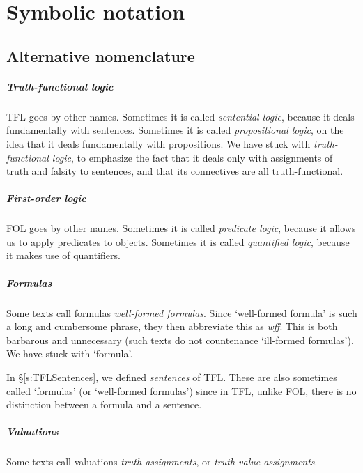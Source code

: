
\chapter{Symbolic notation}
\label{app.notation}

\section{Alternative nomenclature}

\paragraph{Truth-functional logic} TFL goes by other names. Sometimes it is called \emph{sentential logic}, because it deals fundamentally with sentences. Sometimes it is called \emph{propositional logic}, on the idea that it deals fundamentally with propositions. We have stuck with \emph{truth-functional logic}, to emphasize the fact that it deals only with assignments of truth and falsity to sentences, and that its connectives are all truth-functional.

\paragraph{First-order logic} FOL goes by other names. Sometimes it is called \emph{predicate logic}, because it allows us to apply  predicates to objects. Sometimes it is called \emph{quantified logic}, because it makes use of quantifiers.

\paragraph{Formulas} Some texts call formulas \emph{well-formed formulas}. Since `well-formed formula' is such a long and cumbersome phrase, they then abbreviate this as \emph{wff}. This is both barbarous and unnecessary (such texts do not countenance `ill-formed formulas'). We have stuck with `formula'.

In \S\ref{s:TFLSentences}, we defined \emph{sentences} of TFL. These are also sometimes called `formulas' (or `well-formed formulas') since in TFL, unlike FOL, there is no distinction between a formula and a sentence.

\paragraph{Valuations} Some texts call valuations \emph{truth-assignments}, or \emph{truth-value assignments}.

